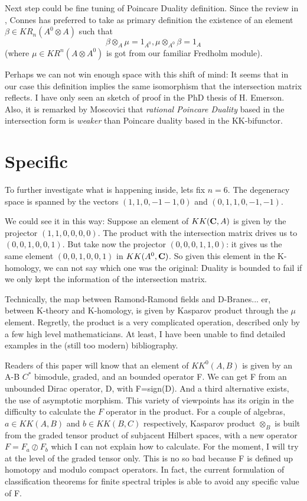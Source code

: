\documentclass[a4paper,10pt]{article}
\begin{document}
Next step could be fine tuning of Poincare Duality definition. Since the 
review in \cite{asterisque}, Connes has preferred to take as primary 
definition the existence of an element $\beta \in KR_n(A^0\otimes A)$ such
that
$$ \beta \otimes_A \mu = 1_{A^0},  \mu \otimes_{A^0} \beta = 1_A $$ 
(where $\mu \in KR^n(A\otimes A^0)$ is got from our familiar Fredholm module). 

Perhaps we can not win enough space with this shift of mind:
It seems that in our case this definition implies the same isomorphism that the
intersection matrix reflects.   I have only seen an sketch of proof in
the PhD thesis of H. Emerson.  Also, it is remarked by Moscovici that
{\it rational Poincare Duality} based in the intersection form is
{\it weaker} than Poincare  duality based in the KK-bifunctor.


 
\section{Specific}

To further investigate what is happening inside, lets fix $n=6$. The
degeneracy space is spanned by the vectors $(1,1,0,-1-1,0)$ and
 $(0,1,1,0,-1,-1)$.

We could see it in this way: Suppose an element of $KK({\bf C},A)$ is given by
the projector $(1,1,0,0,0,0)$. The product with the intersection
matrix drives us to $(0,0,1,0,0,1)$. But take now the projector
$(0,0,0,1,1,0)$: it gives us the same element $(0,0,1,0,0,1)$ in 
$KK(A^0,{\bf C})$. So given this element in the K-homology, we can not say
which one was the original: Duality is bounded to fail if we only
kept the information of the intersection matrix.


Technically, the map between Ramond-Ramond fields and D-Branes... er, 
between K-theory and K-homology, is given by Kasparov product through
the $\mu$ element. Regretly, the product is a very complicated operation,
described only by a few high level mathematicians. At least, I have 
been unable to find detailed examples in the (still too modern)
bibliography. 

Readers of this paper will know that an element of $KK^0(A,B)$ is
given by an A-B $C^*$ bimodule, graded, and an bounded operator
F.  We can get F from an unbounded Dirac operator,
D, with F=sign(D). And a third alternative exists, the use of
asymptotic morphism. This variety of viewpoints has its origin in
the difficulty to calculate the $F$ operator in the product. For a 
couple of algebras, $a \in KK(A,B)$ and $b \in KK(B,C)$ respectively, Kasparov
product $\otimes_B$ is built from the graded tensor product of subjacent
Hilbert spaces, with a new operator $F=F_a \oslash F_b$ which I can not
explain how to calculate. 
For the moment, I will try at the level of the graded tensor only. This is no
so bad because F is defined up homotopy and modulo compact operators. In fact,
the current formulation of classification theorems for finite spectral
triples \cite{kr1,PS} is able
to avoid any specific value of F.
\end{document}
